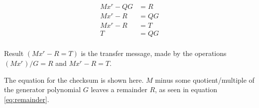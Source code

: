 \begin{align}
	Mx^r - QG &= R \label{eq:remainder} \\
	Mx^r - R  &= QG \\
	Mx^r - R  &= T \\
	T &= QG \\
\end{align}

Result $(Mx^r - R = T)$ is the transfer message, made by the operations $(Mx^r) / G = R$ and $Mx^r - R = T$.

The equation for the checksum is shown here. $M$ minus some quotient/multiple of the generator polynomial $G$ leaves a remainder $R$, as seen in equation \ref{eq:remainder}. 

